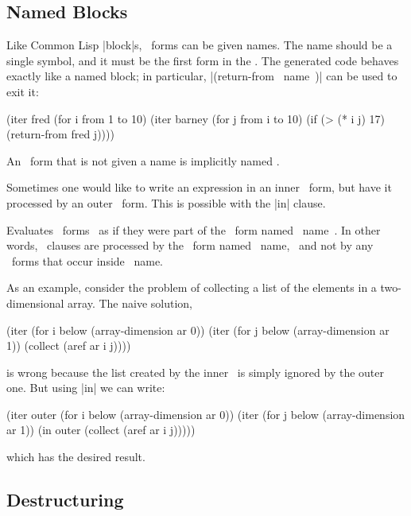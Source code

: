 \subsection{Named Blocks}

Like Common Lisp |block|s, \iter\ forms can be given names.  The
name should be a single symbol, and it must be the first form in the
\iter.  The generated code behaves exactly like a named block; in
particular, |(return-from ~name~)| can be used to exit it:
\begin{program}
(iter fred
      (for i from 1 to 10)
      (iter barney
            (for j from i to 10)
            (if (> (* i j) 17)
                (return-from fred j))))
\end{program}
An \iter\ form that is not given a name is implicitly named \nil.

Sometimes one would like to write an expression in an inner \iter\ form,
but have it processed by an outer \iter\ form.  This is possible with
the |in| clause.  

\begin{clauses}

Evaluates ~forms~ as if they were part of the \iter\ form named
~name~.  In other words, \iter\ clauses are processed by the \iter\
form named ~name,~ and not by any \iter\ forms that occur inside ~name.~

\cpar As an example, consider the problem of collecting a list of the
elements in a two-dimensional array.  The naive solution,
\begin{program}
(iter (for i below (array-dimension ar 0))
      (iter (for j below (array-dimension ar 1))
            (collect (aref ar i j))))
\end{program}
\noindent is wrong because the list created by the inner \iter\ is simply
ignored by the outer one.  But using |in| we can write:
\begin{program}
(iter outer (for i below (array-dimension ar 0))
      (iter (for j below (array-dimension ar 1))
            (in outer (collect (aref ar i j)))))
\end{program}
\noindent which has the desired result.

\end{clauses}

\subsection{Destructuring}
\label{destructuring}

